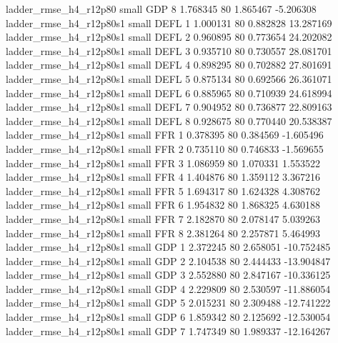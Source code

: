    ladder_rmse_h4_r12p80      small      GDP                 8 1.768345 80       1.865467          -5.206308
 ladder_rmse_h4_r12p80s1      small     DEFL                 1 1.000131 80       0.882828          13.287169
 ladder_rmse_h4_r12p80s1      small     DEFL                 2 0.960895 80       0.773654          24.202082
 ladder_rmse_h4_r12p80s1      small     DEFL                 3 0.935710 80       0.730557          28.081701
 ladder_rmse_h4_r12p80s1      small     DEFL                 4 0.898295 80       0.702882          27.801691
 ladder_rmse_h4_r12p80s1      small     DEFL                 5 0.875134 80       0.692566          26.361071
 ladder_rmse_h4_r12p80s1      small     DEFL                 6 0.885965 80       0.710939          24.618994
 ladder_rmse_h4_r12p80s1      small     DEFL                 7 0.904952 80       0.736877          22.809163
 ladder_rmse_h4_r12p80s1      small     DEFL                 8 0.928675 80       0.770440          20.538387
 ladder_rmse_h4_r12p80s1      small      FFR                 1 0.378395 80       0.384569          -1.605496
 ladder_rmse_h4_r12p80s1      small      FFR                 2 0.735110 80       0.746833          -1.569655
 ladder_rmse_h4_r12p80s1      small      FFR                 3 1.086959 80       1.070331           1.553522
 ladder_rmse_h4_r12p80s1      small      FFR                 4 1.404876 80       1.359112           3.367216
 ladder_rmse_h4_r12p80s1      small      FFR                 5 1.694317 80       1.624328           4.308762
 ladder_rmse_h4_r12p80s1      small      FFR                 6 1.954832 80       1.868325           4.630188
 ladder_rmse_h4_r12p80s1      small      FFR                 7 2.182870 80       2.078147           5.039263
 ladder_rmse_h4_r12p80s1      small      FFR                 8 2.381264 80       2.257871           5.464993
 ladder_rmse_h4_r12p80s1      small      GDP                 1 2.372245 80       2.658051         -10.752485
 ladder_rmse_h4_r12p80s1      small      GDP                 2 2.104538 80       2.444433         -13.904847
 ladder_rmse_h4_r12p80s1      small      GDP                 3 2.552880 80       2.847167         -10.336125
 ladder_rmse_h4_r12p80s1      small      GDP                 4 2.229809 80       2.530597         -11.886054
 ladder_rmse_h4_r12p80s1      small      GDP                 5 2.015231 80       2.309488         -12.741222
 ladder_rmse_h4_r12p80s1      small      GDP                 6 1.859342 80       2.125692         -12.530054
 ladder_rmse_h4_r12p80s1      small      GDP                 7 1.747349 80       1.989337         -12.164267
